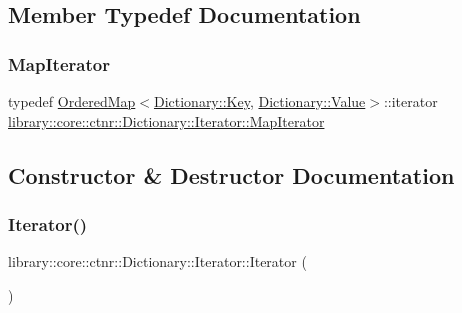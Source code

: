 \subsection{Member Typedef Documentation}
\mbox{\label{classlibrary_1_1core_1_1ctnr_1_1Dictionary_1_1Iterator_a990205e908ac1bafcd754993219b805e}} 
\subsubsection{\texorpdfstring{Map\+Iterator}{MapIterator}}
{\footnotesize\ttfamily typedef \hyperlink{namespacelibrary_1_1core_1_1ctnr_a1c0809231c3bc9fccce602bd7941a36b}{Ordered\+Map}$<$\hyperlink{classlibrary_1_1core_1_1ctnr_1_1Dictionary_a987cae687cce70d81a2a483c5e05e842}{Dictionary\+::\+Key}, \hyperlink{classlibrary_1_1core_1_1ctnr_1_1Dictionary_a3baf6692694e4fc27cb399ac083c88ea}{Dictionary\+::\+Value}$>$\+::iterator \hyperlink{classlibrary_1_1core_1_1ctnr_1_1Dictionary_1_1Iterator_a990205e908ac1bafcd754993219b805e}{library\+::core\+::ctnr\+::\+Dictionary\+::\+Iterator\+::\+Map\+Iterator}}



\subsection{Constructor \& Destructor Documentation}
\mbox{\label{classlibrary_1_1core_1_1ctnr_1_1Dictionary_1_1Iterator_aa058bf5cb2ff90c93bb3de0925483453}} 
\subsubsection{\texorpdfstring{Iterator()}{Iterator()}\hspace{0.1cm}{\footnotesize\ttfamily [1/3]}}
{\footnotesize\ttfamily library\+::core\+::ctnr\+::\+Dictionary\+::\+Iterator\+::\+Iterator (\begin{DoxyParamCaption}{ }\end{DoxyParamCaption})}

